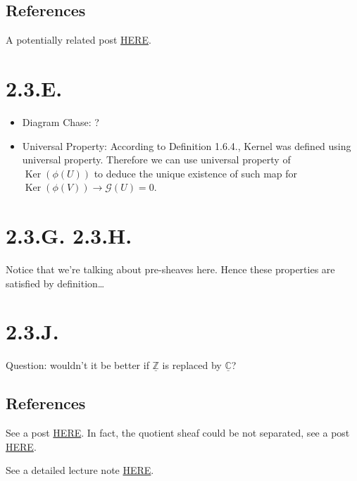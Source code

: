 \subsection{References}

A potentially related post \href{https://math.stackexchange.com/questions/3755492/isomorphism-of-hom-sheaf}{HERE}.

\section{2.3.E.}

\begin{itemize}

\item Diagram Chase: ?

\item Universal Property: According to Definition 1.6.4., Kernel was defined using universal property. Therefore we can use universal property of $\operatorname{Ker}(\phi(U))$ to deduce the unique existence of such map for $\operatorname{Ker}(\phi(V))\to \mathscr G(U)=0$.
\end{itemize}

\section{2.3.G. 2.3.H.}

Notice that we're talking about pre-sheaves here. Hence these properties are satisfied by definition\dots

\section{2.3.J.}

Question: wouldn't it be better if $\underline{\mathbb Z}$ is replaced by $\underline{\mathbb C}$?

\subsection{References}

See a post \href{https://math.stackexchange.com/questions/847367/cokernel-of-a-sheaf-morphism-not-being-a-sheaf}{HERE}.
In fact, the quotient sheaf could be not separated, see a post \href{https://mathoverflow.net/questions/182386/is-the-cokernel-of-a-map-of-sheaves-a-seperated-presheaf}{HERE}.

See a detailed lecture note \href{https://www.kth.se/polopoly_fs/1.291614.1550158503!/Menu/general/column-content/attachment/Lecture1AlgGeo.pdf}{HERE}.


